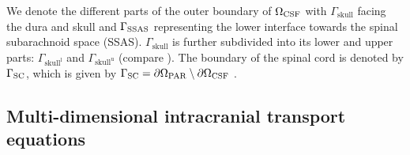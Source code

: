 \documentclass[fleqn,10pt]{wlscirep}
\begin{document}
We denote the different parts of the outer boundary of $\Omega_{\rm CSF}$ with
$\Gamma_{\mathrm{skull}}$ facing the dura and skull and $\Gamma_{\rm SSAS}$ representing the lower interface towards the spinal subarachnoid space (SSAS). $\Gamma_{\mathrm{skull}}$ is further subdivided into its lower and upper parts: $\Gamma_{\mathrm{skull^l}}$ and $\Gamma_{\mathrm{skull^u}}$ (compare ). The boundary of the spinal cord is denoted by $\Gamma_{\rm{SC}}$, which is given by $\Gamma_{\rm{SC}} = \partial \Omega_{\rm PAR} \setminus \partial \Omega_{\rm CSF}$ .


\subsection*{Multi-dimensional intracranial transport equations}
\end{document}
